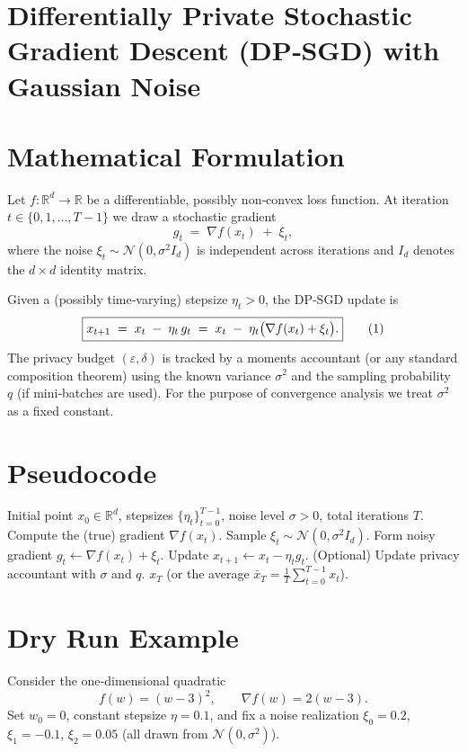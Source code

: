 \documentclass{article}
\newcommand{\R}{\mathbb{R}}
\begin{document}
\section*{Differentially Private Stochastic Gradient Descent (DP‑SGD) with Gaussian Noise}

\section*{Mathematical Formulation}
Let $f:\R^{d}\to\R$ be a differentiable, possibly non‑convex loss function.  
At iteration $t\in\{0,1,\dots,T-1\}$ we draw a stochastic gradient
\[
g_{t}\;=\;\nabla f(x_{t})\;+\;\xi_{t},
\]
where the noise $\xi_{t}\sim\mathcal{N}(0,\sigma^{2}I_{d})$ is independent across
iterations and $I_{d}$ denotes the $d\times d$ identity matrix.  

Given a (possibly time‑varying) stepsize $\eta_{t}>0$, the DP‑SGD update is
\begin{equation}
\boxed{%
x_{t+1}\;=\;x_{t}\;-\;\eta_{t}\,g_{t}
\;=\;x_{t}\;-\;\eta_{t}\bigl(\nabla f(x_{t})+\xi_{t}\bigr).}
\tag{1}
\end{equation}
The privacy budget $(\varepsilon,\delta)$ is tracked by a moments accountant
(or any standard composition theorem) using the known variance $\sigma^{2}$
and the sampling probability $q$ (if mini‑batches are used).  For the
purpose of convergence analysis we treat $\sigma^{2}$ as a fixed constant.

\section*{Pseudocode}
\begin{algorithm}[H]
\caption{DP‑SGD with Gaussian Noise}
\begin{algorithmic}[1]
\Require Initial point $x_{0}\in\R^{d}$, stepsizes $\{\eta_{t}\}_{t=0}^{T-1}$,
noise level $\sigma>0$, total iterations $T$.
    \State Compute the (true) gradient $\nabla f(x_{t})$.
    \State Sample $\xi_{t}\sim\mathcal{N}(0,\sigma^{2}I_{d})$.
    \State Form noisy gradient $g_{t}\gets\nabla f(x_{t})+\xi_{t}$.
    \State Update $x_{t+1}\gets x_{t}-\eta_{t}g_{t}$.
    \State (Optional) Update privacy accountant with $\sigma$ and $q$.
\EndFor
\State \Return $x_{T}$ (or the average $\bar x_{T}= \tfrac1T\sum_{t=0}^{T-1}x_{t}$).
\end{algorithmic}
\end{algorithm}

\section*{Dry Run Example}
Consider the one‑dimensional quadratic
\[
f(w)=(w-3)^{2},\qquad \nabla f(w)=2(w-3).
\]
Set $w_{0}=0$, constant stepsize $\eta=0.1$, and fix a noise realization
$\xi_{0}=0.2$, $\xi_{1}=-0.1$, $\xi_{2}=0.05$ (all drawn from $\mathcal N(0,\sigma^{2})$).
\end{document}
